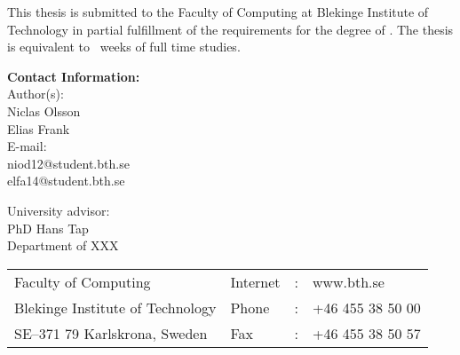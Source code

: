 \documentclass[a4paper,oneside]{bth}
\begin{document}
{\pagestyle{empty}
\changepage{5cm}{1cm}{-0.5cm}{-0.5cm}{}{-2cm}{}{}{}
\noindent
{\small
This thesis is submitted to the Faculty of Computing at Blekinge Institute
of Technology in partial fulfillment of the requirements for the degree of
\thesisDegree. The thesis is equivalent to \thesisWeeks\ 
weeks of full time studies.
}

\vspace{15cm}

\noindent
\textbf{Contact Information:} \\
Author(s): \\
Niclas Olsson \\
Elias Frank \\
E-mail:\\
niod12@student.bth.se \\
elfa14@student.bth.se

\vspace{2cm}

\noindent
University advisor: \\
PhD Hans Tap \\
Department of XXX


\vspace*{\fill}

\noindent
\begin{tabular}{@{}p{} l c l}
Faculty of Computing             & Internet & : & www.bth.se \\
Blekinge Institute of Technology & Phone    & : & +46 455 38 50 00 \\
SE--371 79 Karlskrona, Sweden    & Fax      & : & +46 455 38 50 57 \\
\end{tabular}
\clearpage
} %

\setcounter{page}{1}
\end{document}
